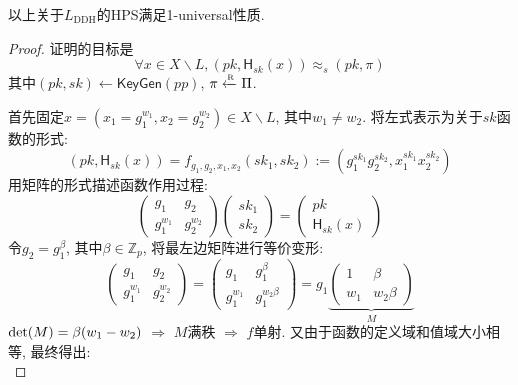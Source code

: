 \begin{lemma}
以上关于$L_\text{DDH}$的HPS满足1-universal性质. 
\end{lemma}

\begin{proof}
证明的目标是
\begin{equation*}
    \forall x \in X \backslash L, (pk, \mathsf{H}_{sk}(x)) \approx_s (pk, \pi)
\end{equation*}
其中$(pk, sk) \leftarrow \mathsf{KeyGen}(pp)$, $\pi \xleftarrow{\textup{\tiny R}} \Pi$. 


首先固定$x = (x_1 = g_1^{w_1}, x_2 = g_2^{w_2}) \in X \backslash L$, 其中$w_1 \neq w_2$. 
将左式表示为关于$sk$函数的形式:
\begin{equation*}
    (pk, \mathsf{H}_{sk}(x)) = f_{g_1, g_2, x_1, x_2}(sk_1,sk_2) := (g_1^{sk_1}g_2^{sk_2}, x_1^{sk_1}x_2^{sk_2})
\end{equation*}
用矩阵的形式描述函数作用过程:
\begin{displaymath}
\left(\begin{array}{cc}
g_1 & g_2\\
g_1^{w_1} & g_2^{w_2}
\end{array} \right)
\left(\begin{array}{c}
sk_1\\
sk_2
\end{array} \right) 
= 
\left(\begin{array}{c}
pk\\
\mathsf{H}_{sk}(x)
\end{array} \right)
\end{displaymath} 
令$g_2 = g_1^\beta$, 其中$\beta \in \mathbb{Z}_p$, 将最左边矩阵进行等价变形: 
\begin{displaymath}
\left(\begin{array}{cc}
g_1 & g_2\\
g_1^{w_1} & g_2^{w_2}
\end{array} \right) = 
\left(\begin{array}{cc}
g_1 & g_1^{\beta}\\
g_1^{w_1} & g_1^{w_2\beta}
\end{array} \right) = 
g_1
\underbrace{
\left(\begin{array}{cc}
1 & \beta\\
w_1 & w_2\beta
\end{array} \right)
}_{M} 
\end{displaymath}
$\textup{det}(M) = \beta(w_1-w_2)$ $\Rightarrow$ $M$满秩 $\Rightarrow$ 
$f$单射. 又由于函数的定义域和值域大小相等, 最终得出:  
\begin{displaymath}

\end{displaymath}
\end{proof}
